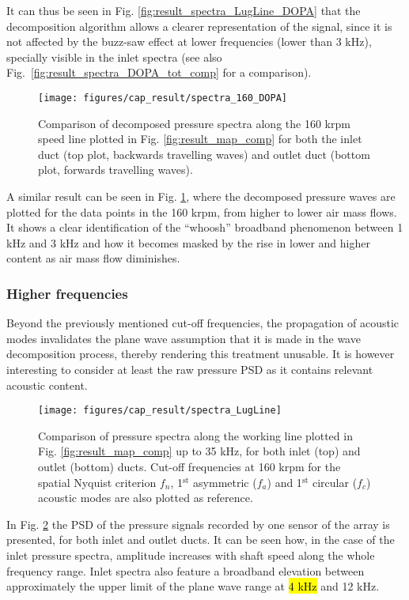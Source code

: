 It can thus be seen in Fig. \ref{fig:result_spectra_LugLine_DOPA} that the decomposition algorithm allows a clearer representation of the signal, since it is not affected by the buzz-saw effect at lower frequencies (lower than 3 kHz), specially visible in the inlet spectra (see also Fig.~\ref{fig:result_spectra_DOPA_tot_comp} for a comparison).

\begin{figure}[tbh!]
\centering
\texttt{[image: figures/cap\_result/spectra\_160\_DOPA]}
\caption{Comparison of decomposed pressure spectra along the 160 krpm speed line plotted in Fig. \ref{fig:result_map_comp} for both the inlet duct (top plot, backwards travelling waves) and outlet duct (bottom plot, forwards travelling waves).}
\label{fig:result_spectra_160_DOPA}
\end{figure}

A similar result can be seen in Fig. \ref{fig:result_spectra_160_DOPA}, where the decomposed pressure waves are plotted for the data points in the 160 krpm, from higher to lower air mass flows. It shows a clear identification of the ``whoosh'' broadband phenomenon between 1 kHz and 3 kHz and how it becomes masked by the rise in lower and higher content as air mass flow diminishes.

\subsubsection{Higher frequencies}

Beyond the previously mentioned cut-off frequencies, the propagation of acoustic modes invalidates the plane wave assumption that it is made in the wave decomposition process, thereby rendering this treatment unusable. It is however interesting to consider at least the raw pressure PSD as it contains relevant acoustic content.

\begin{figure}[b!]
\centering
\texttt{[image: figures/cap\_result/spectra\_LugLine]}
\caption{Comparison of pressure spectra along the working line  plotted in Fig. \ref{fig:result_map_comp} up to 35 kHz, for both inlet (top) and outlet (bottom) ducts. Cut-off frequencies at 160 krpm for the spatial Nyquist criterion $f_n$, 1${}^\text{st}$ asymmetric ($f_a$) and 1${}^\text{st}$ circular ($f_c$) acoustic modes are also plotted as reference.}
\label{fig:result_spectra_LugLine}
\end{figure}

In Fig. \ref{fig:result_spectra_LugLine} the PSD of the pressure signals recorded by one sensor of the array is presented, for both inlet and outlet ducts. It can be seen how, in the case of the inlet pressure spectra, amplitude increases with shaft speed along the whole frequency range. Inlet spectra also feature a broadband elevation between approximately the upper limit of the plane wave range at \hl{4 kHz} and 12 kHz.


